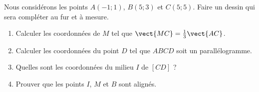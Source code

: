 
\begin{exercice}\label{exosmath-0690}

    Nous considérons les points \( A(-1;1)\), \( B(5;3)\) et \( C(5;5)\). Faire un dessin qui sera compléter au fur et à mesure.
    \begin{enumerate}
        \item
            Calculer les coordonnées de \( M\) tel que \( \vect{ MC }=\frac{1}{ 3 }\vect{ AC }\).
        \item
            Calculer les coordonnées du point \( D\) tel que \( ABCD\) soit un parallélogramme.
        \item
            Quelles sont les coordonnées du milieu \( I\) de \( [CD]\) ?
        \item
            Prouver que les points \( I\), \( M\) et \( B\) sont alignés.
    \end{enumerate}

\end{exercice}

